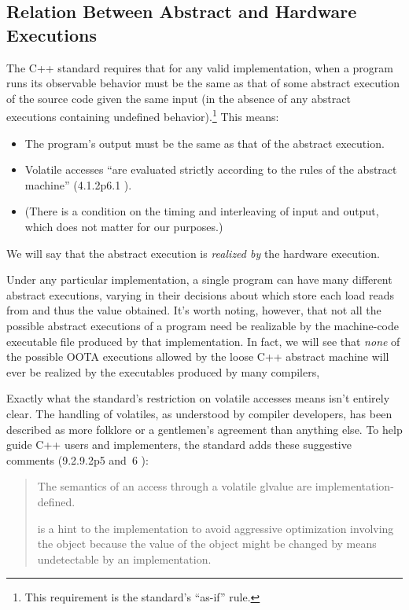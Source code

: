 \documentclass[10]{article}
\begin{document}
\subsection{Relation Between Abstract and Hardware Executions}
\label{sec:Relation Between Abstract and Hardware Executions}

The C++ standard requires that for any valid implementation, when a
program runs its observable behavior must be the same as that of some
abstract execution of the source code given the same input (in the
absence of any abstract executions containing undefined behavior).\footnote{
	This requirement is the standard's ``as-if'' rule.}
This means:
\begin{itemize}
\item	The program's output must be the same as that of the abstract
	execution.
\item	Volatile accesses ``are evaluated strictly according to the
	rules of the abstract machine'' (4.1.2p6.1 ).
\item	(There is a condition on the timing and interleaving of input and output,
	which does not matter for our purposes.)
\end{itemize}
We will say that the abstract execution is \emph{realized by} the
hardware execution.

Under any particular implementation,
a single program can have many different abstract executions,
varying in their decisions about which store each load reads from
and thus the value obtained.
It's worth noting, however, that not all the possible abstract executions
of a program need be realizable by the machine-code executable file
produced by that implementation.
In fact, we will see that \emph{none} of the possible OOTA executions
allowed by the loose C++ abstract machine will ever be realized
by the executables produced by many compilers,

Exactly what the standard's restriction on volatile accesses means
isn't entirely clear.
The handling of volatiles, as understood by compiler developers, has
been described as more folklore or a gentlemen's agreement than
anything else.
To help guide C++ users and implementers, the standard adds these
suggestive comments (9.2.9.2p5 and~6 ):
\begin{quote}
	The semantics of an access through a volatile glvalue are
	implementation-defined.

	 is a hint to the implementation to avoid aggressive
	optimization involving the object because the value of the object
	might be changed by means undetectable by an implementation.
\end{quote}
\end{document}
